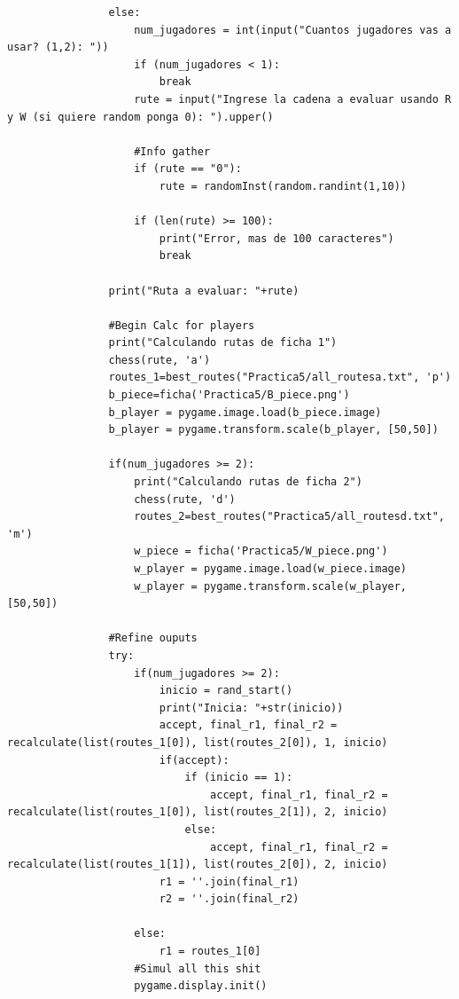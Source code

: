 \documentclass{article}
\begin{document}
\begin{lstlisting}
                else:    
                    num_jugadores = int(input("Cuantos jugadores vas a usar? (1,2): "))
                    if (num_jugadores < 1):
                        break
                    rute = input("Ingrese la cadena a evaluar usando R y W (si quiere random ponga 0): ").upper()
                
                    #Info gather
                    if (rute == "0"):
                        rute = randomInst(random.randint(1,10))
                
                    if (len(rute) >= 100):
                        print("Error, mas de 100 caracteres")
                        break
                
                print("Ruta a evaluar: "+rute)
                
                #Begin Calc for players
                print("Calculando rutas de ficha 1")
                chess(rute, 'a')
                routes_1=best_routes("Practica5/all_routesa.txt", 'p')
                b_piece=ficha('Practica5/B_piece.png')
                b_player = pygame.image.load(b_piece.image)
                b_player = pygame.transform.scale(b_player, [50,50])
                
                if(num_jugadores >= 2): 
                    print("Calculando rutas de ficha 2")
                    chess(rute, 'd')
                    routes_2=best_routes("Practica5/all_routesd.txt", 'm')
                    w_piece = ficha('Practica5/W_piece.png')
                    w_player = pygame.image.load(w_piece.image)
                    w_player = pygame.transform.scale(w_player, [50,50])
                
                #Refine ouputs
                try:
                    if(num_jugadores >= 2):
                        inicio = rand_start()
                        print("Inicia: "+str(inicio))
                        accept, final_r1, final_r2 = recalculate(list(routes_1[0]), list(routes_2[0]), 1, inicio)
                        if(accept):
                            if (inicio == 1):
                                accept, final_r1, final_r2 = recalculate(list(routes_1[0]), list(routes_2[1]), 2, inicio)
                            else:
                                accept, final_r1, final_r2 = recalculate(list(routes_1[1]), list(routes_2[0]), 2, inicio)
                        r1 = ''.join(final_r1)
                        r2 = ''.join(final_r2)
                        
                    else:
                        r1 = routes_1[0]
                    #Simul all this shit
                    pygame.display.init()
                    

\end{lstlisting}
\end{document}
